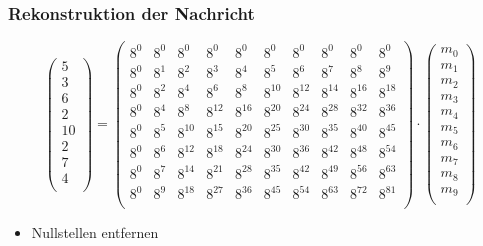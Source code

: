 \documentclass[11pt,aspectratio=169]{beamer}
\begin{document}
	\begin{frame}
		\frametitle{Rekonstruktion der Nachricht}
		
		\[
		\begin{pmatrix}
			5 \\ 3 \\ 6 \\ 2 \\ 10 \\ 2 \\ 7 \\ 4 \\
		\end{pmatrix}
		=
		\begin{pmatrix}
			8^0&    8^0&    8^0&    8^0&    8^0&    8^0&    8^0&    8^0&    8^0&    8^0\\
			8^0&	8^1&	8^2&	8^3&	8^4&	8^5&	8^6&	8^7&    8^8&	8^9\\
			8^0&	8^2&	8^4&	8^6&	8^8& 8^{10}& 8^{12}& 8^{14}& 8^{16}& 8^{18}\\
			8^0&	8^4&	8^8& 8^{12}& 8^{16}& 8^{20}& 8^{24}& 8^{28}& 8^{32}& 8^{36}\\
			8^0&	8^5& 8^{10}& 8^{15}& 8^{20}& 8^{25}& 8^{30}& 8^{35}& 8^{40}& 8^{45}\\
			8^0&	8^6& 8^{12}& 8^{18}& 8^{24}& 8^{30}& 8^{36}& 8^{42}& 8^{48}& 8^{54}\\
			8^0&	8^7& 8^{14}& 8^{21}& 8^{28}& 8^{35}& 8^{42}& 8^{49}& 8^{56}& 8^{63}\\
			8^0&	8^9& 8^{18}& 8^{27}& 8^{36}& 8^{45}& 8^{54}& 8^{63}& 8^{72}& 8^{81}\\
		\end{pmatrix}
		\cdot
		\begin{pmatrix}
			m_0 \\ m_1 \\ m_2 \\ m_3 \\ m_4 \\ m_5 \\ m_6 \\ m_7 \\ m_8 \\ m_9 \\
		\end{pmatrix}
		\]
		
		\begin{itemize}
			\item Nullstellen entfernen
		\end{itemize}
		
	\end{frame}
\end{document}
